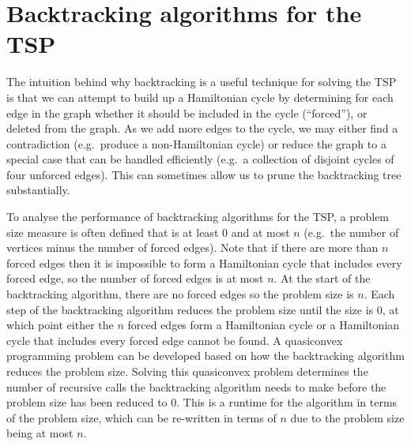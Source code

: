 


\section{Backtracking algorithms for the TSP}
\label{sec:backtrack-tsp}

The intuition behind why backtracking is a useful technique for solving the TSP is that we can attempt to build up a Hamiltonian cycle by determining for each edge in the graph whether it should be included in the cycle (``forced''), or deleted from the graph. As we add more edges to the cycle, we may either find a contradiction (e.g.\ produce a non-Hamiltonian cycle) or reduce the graph to a special case that can be handled efficiently (e.g.\ a collection of disjoint cycles of four unforced edges). This can sometimes allow us to prune the backtracking tree substantially.

To analyse the performance of backtracking algorithms for the TSP, a problem size measure is often defined that is at least 0 and at most $n$ (e.g.\ the number of vertices minus the number of forced edges). Note that if there are more than $n$ forced edges then it is impossible to form a Hamiltonian cycle that includes every forced edge, so the number of forced edges is at most $n$. At the start of the backtracking algorithm, there are no forced edges so the problem size is $n$. Each step of the backtracking algorithm reduces the problem size until the size is $0$, at which point either the $n$ forced edges form a Hamiltonian cycle or a Hamiltonian cycle that includes every forced edge cannot be found. A quasiconvex programming problem can be developed based on how the backtracking algorithm reduces the problem size. Solving this quasiconvex problem determines the number of recursive calls the backtracking algorithm needs to make before the problem size has been reduced to $0$. This is a runtime for the algorithm in terms of the problem size, which can be re-written in terms of $n$ due to the problem size being at most $n$.

